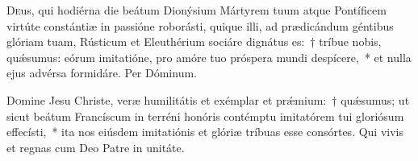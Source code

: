 \documentclass[vesperale_romanum.tex]{subfiles}
\begin{document}



\oratio

\lettrine{D}{e}us, qui hodiérna die beátum Dionýsium Mártyrem tuum atque Pontíficem virtúte constántiæ in passióne roborásti, quique illi, ad prædicándum géntibus glóriam tuam, Rústicum et Eleuthérium sociáre dignátus es:~† tríbue nobis, quǽsumus: eórum imitatióne, pro amóre tuo próspera mundi despícere,~* et nulla ejus advérsa formidáre.
Per Dóminum.

\commsequentis

\myrule


\semiduplexmtv

\oratio

\lettrine{D}{o}mine Jesu Christe, veræ humilitátis et exémplar et prǽmium:~† quǽsumus; ut sicut beátum Francíscum in terréni honóris contémptu imitatórem tui gloriósum effecísti,~* ita nos eiúsdem imitatiónis et glóriæ tríbuas esse consórtes.
Qui vivis et regnas cum Deo Patre in unitáte.


\myrule












\end{document}
